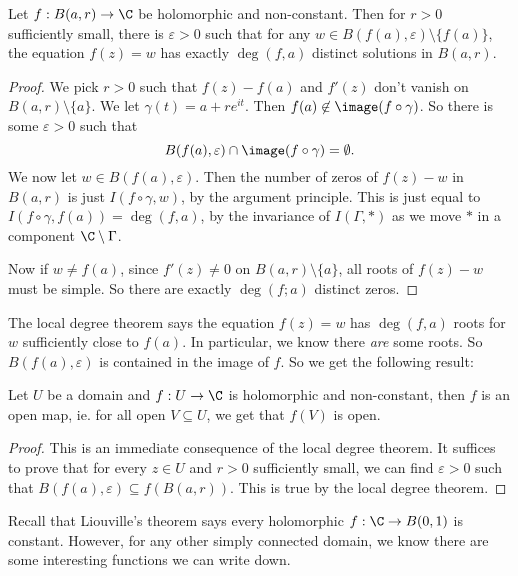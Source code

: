 \documentclass[a4paper]{article}
\begin{document}
\begin{prop}
  Let $f: B(a, r) \to \C$ be holomorphic and non-constant. Then for $r > 0$ sufficiently small, there is $\varepsilon > 0$ such that for any $w \in B(f(a), \varepsilon) \setminus \{f(a)\}$, the equation $f(z) = w$ has exactly $\deg(f, a)$ distinct solutions in $B(a, r)$.
\end{prop}

\begin{proof}
  We pick $r > 0$ such that $f(z) - f(a)$ and $f'(z)$ don't vanish on $B(a, r) \setminus \{a\}$. We let $\gamma(t) = a + re^{it}$. Then $f(a) \not\in \image(f \circ \gamma)$. So there is some $\varepsilon > 0$ such that
  \[
    B(f(a), \varepsilon) \cap \image(f \circ \gamma) = \emptyset.
  \]
  We now let $w \in B(f(a), \varepsilon)$. Then the number of zeros of $f(z) - w$ in $B(a, r)$ is just $I(f \circ \gamma, w)$, by the argument principle. This is just equal to $I(f \circ \gamma, f(a)) = \deg(f, a)$, by the invariance of $I(\Gamma, *)$ as we move $*$ in a component $\C \setminus \Gamma$.

  Now if $w \not= f(a)$, since $f'(z) \not= 0$ on $B(a, r)\setminus \{a\}$, all roots of $f(z) - w$ must be simple. So there are exactly $\deg (f; a)$ distinct zeros.
\end{proof}

The local degree theorem says the equation $f(z) = w$ has $\deg(f, a)$ roots for $w$ sufficiently close to $f(a)$. In particular, we know there \emph{are} some roots. So $B(f(a), \varepsilon)$ is contained in the image of $f$. So we get the following result:

\begin{cor}
  Let $U$ be a domain and $f: U \to \C$ is holomorphic and non-constant, then $f$ is an open map, ie. for all open $V \subseteq U$, we get that $f(V)$ is open.
\end{cor}

\begin{proof}
  This is an immediate consequence of the local degree theorem. It suffices to prove that for every $z \in U$ and $r > 0$ sufficiently small, we can find $\varepsilon > 0$ such that $B(f(a), \varepsilon) \subseteq f(B(a, r))$. This is true by the local degree theorem.
\end{proof}

Recall that Liouville's theorem says every holomorphic $f: \C \to B(0, 1)$ is constant. However, for any other simply connected domain, we know there are some interesting functions we can write down.
\end{document}
